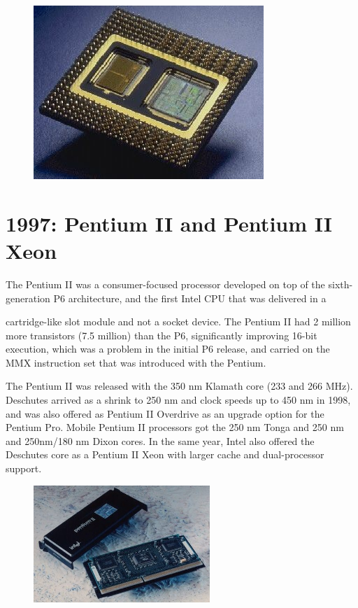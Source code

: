 \begin{figure}[ht!]
	\centering
\includegraphics[scale=0.5]{media/image16.jpeg}
\end{figure}

\hypertarget{pentium-ii-and-pentium-ii-xeon}{%
\section{1997: Pentium II and Pentium II
Xeon}\label{pentium-ii-and-pentium-ii-xeon}}

The Pentium II was a consumer-focused processor developed on top of the
sixth-generation P6 architecture, and the first Intel CPU that was
delivered in a

cartridge-like slot module and not a socket device. The Pentium II had 2
million more transistors (7.5 million) than the P6, significantly
improving 16-bit execution, which was a problem in the initial P6
release, and carried on the MMX instruction set that was introduced with
the Pentium.

The Pentium II was released with the 350 nm Klamath core (233 and 266
MHz). Deschutes arrived as a shrink to 250 nm and clock speeds up to 450
nm in 1998, and was also offered as Pentium II Overdrive as an upgrade
option for the Pentium Pro. Mobile Pentium II processors got the 250 nm
Tonga and 250 nm and 250nm/180 nm Dixon cores. In the same year, Intel
also offered the Deschutes core as a Pentium II Xeon with larger cache
and dual-processor support.

\begin{figure}[ht!]
	\centering
\includegraphics[width=2.62429in,height=1.74604in]{media/image17.jpeg}
\end{figure}

